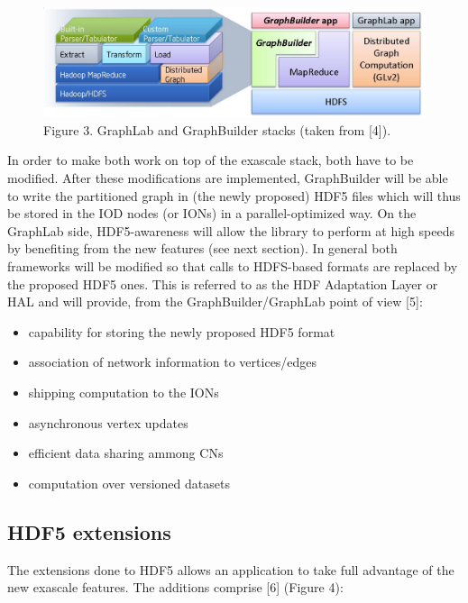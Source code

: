 \documentclass[conference]{IEEEtran}
\begin{document}
\begin{figure}[htbp]
\centering
\includegraphics{images/graphlab-and-graphbuilder.png}
\caption{Figure 3. GraphLab and GraphBuilder stacks (taken from
{[}4{]}).}
\end{figure}

In order to make both work on top of the exascale stack, both have to be
modified. After these modifications are implemented, GraphBuilder will
be able to write the partitioned graph in (the newly proposed) HDF5
files which will thus be stored in the IOD nodes (or IONs) in a
parallel-optimized way. On the GraphLab side, HDF5-awareness will allow
the library to perform at high speeds by benefiting from the new
features (see next section). In general both frameworks will be modified
so that calls to HDFS-based formats are replaced by the proposed HDF5
ones. This is referred to as the HDF Adaptation Layer or HAL and will
provide, from the GraphBuilder/GraphLab point of view {[}5{]}:

\begin{itemize}
\itemsep1pt\parskip0pt
\item
  capability for storing the newly proposed HDF5 format
\item
  association of network information to vertices/edges
\item
  shipping computation to the IONs
\item
  asynchronous vertex updates
\item
  efficient data sharing ammong CNs
\item
  computation over versioned datasets
\end{itemize}

\subsection{HDF5 extensions}\label{hdf5-extensions}

The extensions done to HDF5 allows an application to take full advantage
of the new exascale features. The additions comprise {[}6{]} (Figure 4):
\end{document}
